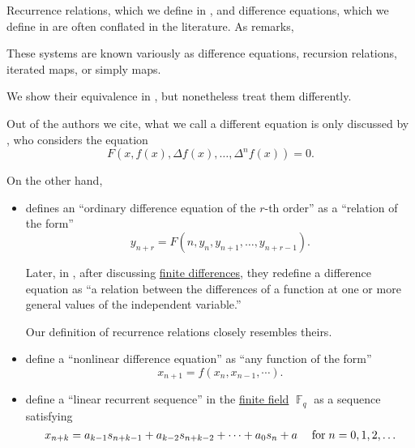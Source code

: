 \begin{remark}\label{rem:recurrence_relations_and_difference_equations_literature_overview}
  Recurrence relations, which we define in , and difference equations, which we define in  are often conflated in the literature. As  remarks,
  \begin{displayquote}
    These systems are known variously as difference equations, recursion relations, iterated maps, or simply maps.
  \end{displayquote}

  We show their equivalence in , but nonetheless treat them differently.

  Out of the authors we cite, what we call a different equation is only discussed by , who considers the equation
  \begin{equation*}
    F(x, f(x), \Delta f(x), \ldots, \Delta^n f(x)) = 0.
  \end{equation*}

  On the other hand,
  \begin{itemize}
    \item {} defines an \enquote{ordinary difference equation of the \( r \)-th order} as a \enquote{relation of the form}
    \begin{equation*}
      y_{n+r} = F(n, y_n, y_{n+1}, \ldots, y_{n+r-1}).
    \end{equation*}

    Later, in \cite[75]{LevyLessman1961FiniteDifferenceEquations}, after discussing \hyperref[def:finite_difference_operator]{finite differences}, they redefine a difference equation as \enquote{a relation between the differences of a function at one or more general values of the independent variable.}

    Our definition of recurrence relations closely resembles theirs.

    \item {} define a \enquote{nonlinear difference equation} as \enquote{any function of the form}
    \begin{equation*}
      x_{n+1} = f(x_n, x_{n-1}, \cdots).
    \end{equation*}

    \item {} define a \enquote{linear recurrent sequence} in the \hyperref[def:finite_field]{finite field} \( \BbbF_q \) as a sequence satisfying
    \begin{equation*}
      x_{n+k} = a_{k-1} s_{n+k-1} + a_{k-2} s_{n+k-2} + \cdots + a_0 s_n + a \quad\T{for} n = 0, 1, 2, \ldots
    \end{equation*}


\end{itemize}
\end{remark}
